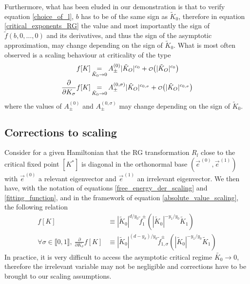 \documentclass[class=report, float=false, crop=false]{standalone}
\begin{document}
Furthermore, what has been eluded in our demonstration is that to verify equation \ref{choice_of_l}, $b$ has to be of the same sign as $\tilde{K}_0$, therefore in equation \ref{critical_exponents_RG} the value and most importantly the sign of $\tilde{f}(b,0,\ldots,0)$ and its derivatives, and thus the sign of the asymptotic approximation, may change depending on the sign of $\tilde{K}_0$. What is most often observed is a scaling behaviour at criticality of the type
\begin{equation}
\begin{aligned}
f[K] &\operatorname*{~=~}_{\tilde{K}_0\rightarrow0} A^{(0)}_{\pm} |\tilde{K}_O|^{c_0} + \smallO{|\tilde{K}_O|^{c_0}}\\
\frac{\partial}{\partial K_{\sigma}}f[K] &\operatorname*{~=~}_{\tilde{K}_0\rightarrow0} A^{(0,\sigma)}_{\pm} |\tilde{K}_O|^{c_{0,\sigma}} + \smallO{|\tilde{K}_O|^{c_{0,\sigma}}}
\end{aligned}
\label{absolute_value_scaling}
\end{equation}
where the values of $A^{(0)}_{\pm}$ and $A^{(0,\sigma)}_{\pm}$ may change depending on the sign of $\tilde{K}_0$.

\subsection{Corrections to scaling}

Consider for a given Hamiltonian that the RG transformation $R_l$ close to the critical fixed point $[K^*]$ is diagonal in the orthonormal base $(\vec{e}^{\hspace{1pt}(0)},\vec{e}^{\hspace{1pt}(1)})$ with $\vec{e}^{\hspace{1pt}(0)}$ a relevant eigenvector and $\vec{e}^{\hspace{1pt}(1)}$ an irrelevant eigenvector. We then have, with the notation of equations \ref{free_energy_der_scaling} and \ref{fitting_function}, and in the framework of equation \ref{absolute_value_scaling}, the following relation
\begin{equation}
\begin{aligned}
f[K] &\equiv \left|\tilde{K}_0\right|^{d/y_0}\tilde{f}_1^{\pm}\left(\left|\tilde{K}_0\right|^{-y_1/y_0}\tilde{K}_1\right)\\
\forall \sigma \in \llbracket0,1\rrbracket,~ \frac{\partial}{\partial K_{\sigma}} f[K] &\equiv \left|\tilde{K}_0\right|^{(d-y_{\sigma})/y_0}\tilde{f}_{1,\sigma}^{\pm}\left(\left|\tilde{K}_0\right|^{-y_1/y_0}\tilde{K}_1\right)
\end{aligned}
\end{equation}
In practice, it is very difficult to access the asymptotic critical regime $\tilde{K_0}\rightarrow0$, therefore the irrelevant variable may not be negligible and corrections have to be brought to our scaling assumptions.\\
\end{document}
